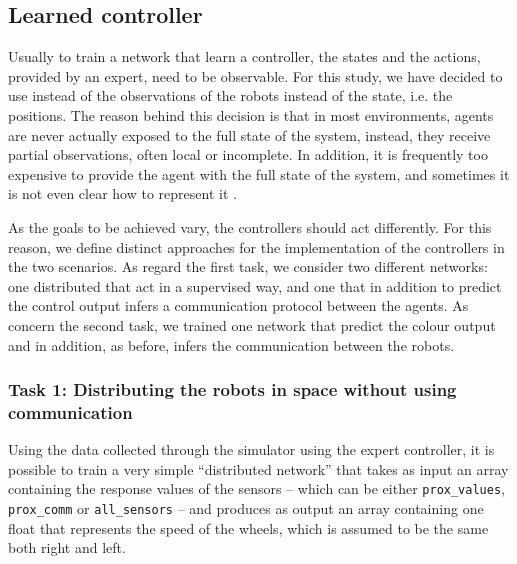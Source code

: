 \begin{lstlisting}[frame=none,caption=Protocol used from the manual controller 
to decide for each robot the message to transmit and the colour., 
label=lst:manualtask2]
\end{lstlisting}


\subsection{Learned controller}
\label{subsec:learned}

Usually to train a network that learn a controller, the states and the actions, 
provided by an expert, need to be observable. For this study, we have decided to 
use instead of the observations of the robots instead of the state, i.e. the positions. 
The reason behind this decision is that in most environments, agents are never 
actually exposed to the full state of the system, instead, they receive partial 
observations, often local or incomplete. In addition, it is frequently too expensive 
to provide the agent with the full state of the system, and sometimes it is not even 
clear how to represent it \cite[][]{ml-agents}.

As the goals to be achieved vary, the controllers should act differently. For this 
reason, we define distinct approaches for the implementation of the controllers 
in the two scenarios.
As regard the first task, we consider two different networks: one distributed that 
act in a supervised way, and one that in addition to predict the control output 
infers a communication protocol between the agents. 
As concern the second task, we trained one network that predict the colour 
output and in addition, as before, infers the communication between the robots.

\subsubsection{Task 1: Distributing the robots in space without using 
communication}

Using the data collected through the simulator using the expert controller, it is 
possible to train a very simple ``distributed network'' that takes as input an array 
containing the response values of the sensors – which can be either 
\texttt{prox\_values}, \texttt{prox\_comm} or \texttt{all\_sensors} – and produces 
as output an array containing one float that represents the speed of the wheels, 
which is assumed to be the same both right and left.

